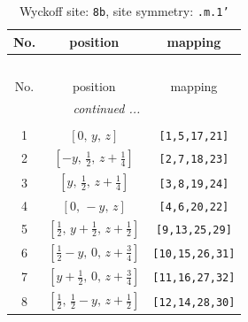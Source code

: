 \documentclass[fleqn,8pt]{jsarticle}
\begin{document}
\begin{longtable}{ccc}
\caption{Wyckoff site: {\tt 8b}, site symmetry: {\tt .m.1'}}
 \\
 \hline \hline
No. & position & mapping \\ \hline \endfirsthead

\multicolumn{2}{l}{\tablename\ \thetable{}} \\
 \hline \hline
No. & position & mapping \\ \hline \endhead

 \hline \hline
\multicolumn{2}{r}{\footnotesize\it continued ...} \\ \endfoot

 \hline \hline
\multicolumn{2}{r}{} \\ \endlastfoot

1 & $\left[ 0,\, y,\, z \right]$ & {\tt [1,5,17,21]} \\ \hline
2 & $\left[ - y,\, \frac{1}{2},\, z + \frac{1}{4} \right]$ & {\tt [2,7,18,23]} \\ \hline
3 & $\left[ y,\, \frac{1}{2},\, z + \frac{1}{4} \right]$ & {\tt [3,8,19,24]} \\ \hline
4 & $\left[ 0,\, - y,\, z \right]$ & {\tt [4,6,20,22]} \\ \hline
5 & $\left[ \frac{1}{2},\, y + \frac{1}{2},\, z + \frac{1}{2} \right]$ & {\tt [9,13,25,29]} \\ \hline
6 & $\left[ \frac{1}{2} - y,\, 0,\, z + \frac{3}{4} \right]$ & {\tt [10,15,26,31]} \\ \hline
7 & $\left[ y + \frac{1}{2},\, 0,\, z + \frac{3}{4} \right]$ & {\tt [11,16,27,32]} \\ \hline
8 & $\left[ \frac{1}{2},\, \frac{1}{2} - y,\, z + \frac{1}{2} \right]$ & {\tt [12,14,28,30]} \\
\end{longtable}
\renewcommand{\arraystretch}{1.2}
\end{document}
